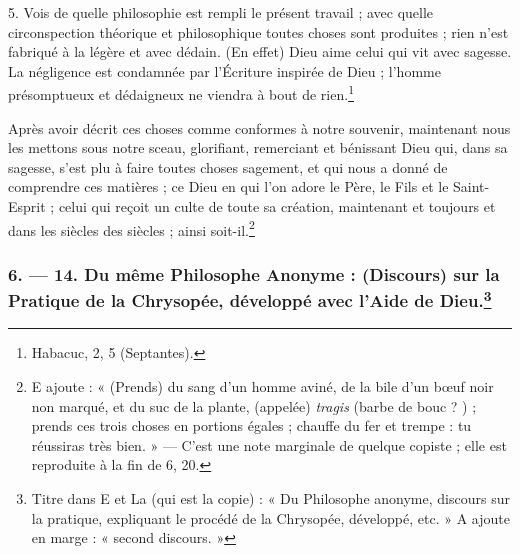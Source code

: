 \documentclass[a4paper, 11pt, oneside, polutonikogreek, french]{article}
\begin{document}
5. Vois de quelle philosophie est rempli le présent travail ; avec quelle circonspection théorique et philosophique toutes choses sont produites ; rien n'est fabriqué à la légère et avec dédain. (En effet) Dieu aime celui qui vit avec sagesse. La négligence est condamnée par l'Écriture inspirée de Dieu ; l'homme présomptueux et dédaigneux ne viendra à bout de rien.\footnote{Habacuc, 2, 5 (Septantes).}

Après avoir décrit ces choses comme conformes à notre souvenir, maintenant nous les mettons sous notre sceau, glorifiant, remerciant et bénissant Dieu qui, dans sa sagesse, s'est plu à faire toutes choses sagement, et qui nous a donné de comprendre ces matières ; ce Dieu en qui l'on adore le Père, le Fils et le Saint-Esprit ; celui qui reçoit un culte de toute sa création, maintenant et toujours et dans les siècles des siècles ; ainsi soit-il.\footnote{E ajoute : « (Prends) du sang d'un homme aviné, de la bile d'un bœuf noir non marqué, et du suc de la plante, (appelée) \emph{tragis} (barbe de bouc ? ) ; prends ces trois choses en portions égales ; chauffe du fer et trempe : tu réussiras très bien. » --- C'est une note marginale de quelque copiste ; elle est reproduite à la fin de 6, 20.}

\bigskip
\centerline{\EightStarTaper}
\centerline{\EightStarTaper\EightStarTaper}
\bigskip

\subsubsection[6. --- 14. Du même Philosophe Anonyme : (Discours) sur la Pratique de la Chrysopée, développé avec l'Aide de Dieu.]{6. --- 14. Du même Philosophe Anonyme : (Discours) sur la Pratique de la Chrysopée, développé avec l'Aide de Dieu.\footnote{Titre dans E et La (qui est la copie) : « Du Philosophe anonyme, discours sur la pratique, expliquant le procédé de la Chrysopée, développé, etc. » A ajoute en marge : « second discours. »}}
\end{document}
